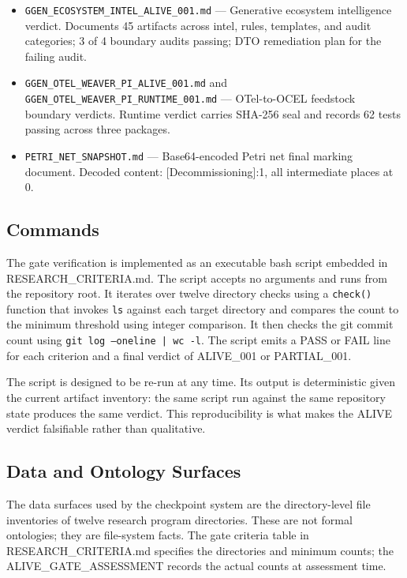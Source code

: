 \begin{itemize}
  \item \texttt{GGEN\_ECOSYSTEM\_INTEL\_ALIVE\_001.md} --- Generative ecosystem intelligence verdict.
        Documents 45 artifacts across intel, rules, templates, and audit categories; 3 of 4 boundary
        audits passing; DTO remediation plan for the failing audit.

  \item \texttt{GGEN\_OTEL\_WEAVER\_PI\_ALIVE\_001.md} and \texttt{GGEN\_OTEL\_WEAVER\_PI\_RUNTIME\_001.md}
        --- OTel-to-OCEL feedstock boundary verdicts. Runtime verdict carries SHA-256 seal and
        records 62 tests passing across three packages.

  \item \texttt{PETRI\_NET\_SNAPSHOT.md} --- Base64-encoded Petri net final marking document.
        Decoded content: [Decommissioning]:1, all intermediate places at 0.
\end{itemize}

\subsection{Commands}
\label{sec:checkpoints-implementation-commands}

The gate verification is implemented as an executable bash script embedded in RESEARCH\_CRITERIA.md.
The script accepts no arguments and runs from the repository root. It iterates over twelve directory
checks using a \texttt{check()} function that invokes \texttt{ls} against each target directory and
compares the count to the minimum threshold using integer comparison. It then checks the git commit
count using \texttt{git log --oneline | wc -l}. The script emits a PASS or FAIL line for each
criterion and a final verdict of ALIVE\_001 or PARTIAL\_001.

The script is designed to be re-run at any time. Its output is deterministic given the current
artifact inventory: the same script run against the same repository state produces the same verdict.
This reproducibility is what makes the ALIVE verdict falsifiable rather than qualitative.

\subsection{Data and Ontology Surfaces}
\label{sec:checkpoints-implementation-data}

The data surfaces used by the checkpoint system are the directory-level file inventories of twelve
research program directories. These are not formal ontologies; they are file-system facts. The gate
criteria table in RESEARCH\_CRITERIA.md specifies the directories and minimum counts; the
ALIVE\_GATE\_ASSESSMENT records the actual counts at assessment time.

